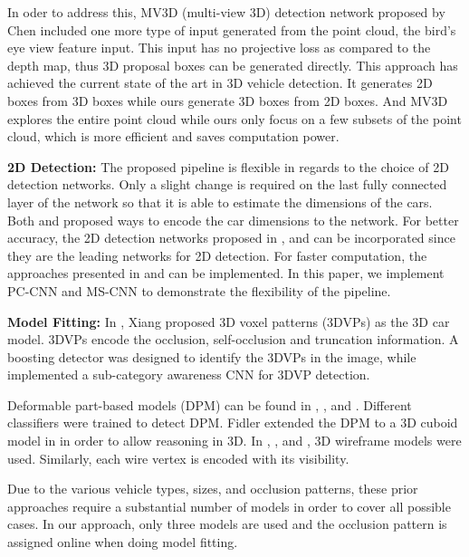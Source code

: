 \documentclass[letterpaper, 10 pt, conference]{ieeeconf}  \usepackage[
\begin{document}
In oder to address this, MV3D (multi-view 3D) detection network proposed by Chen  \cite{Chen2017CVPR} included one more type of input generated from the point cloud, the bird's eye view feature input. This input has no projective loss as compared to the depth map, thus 3D proposal boxes can be generated directly. This approach has achieved the current state of the art in 3D vehicle detection. It generates 2D boxes from 3D boxes while ours generate 3D boxes from 2D boxes. And MV3D explores the entire point cloud while ours only focus on a few subsets of the point cloud, which is more efficient and saves computation power.

\textbf{2D Detection:} The proposed pipeline is flexible in regards to the choice of 2D detection networks. Only a slight change is required on the last fully connected layer of the network so that it is able to estimate the dimensions of the cars. Both \cite{mousavian20163d} and \cite{deepmanta_cvpr17} proposed ways to encode the car dimensions to the network. For better accuracy, the 2D detection networks proposed in \cite{Ren17CVPR}, \cite{deepmanta_cvpr17} and \cite{yang2016exploit} can be incorporated since they are the leading networks for 2D detection. For faster computation, the approaches presented in \cite{redmon2017yolo9000} and \cite{liu2016ssd} can be implemented. In this paper, we implement PC-CNN \cite{du2017iros} and MS-CNN \cite{cai2016unified} to demonstrate the flexibility of the pipeline.

\textbf{Model Fitting:} In \cite{xiang2015data}, Xiang  proposed 3D voxel patterns (3DVPs) as the 3D car model. 3DVPs encode the occlusion, self-occlusion and truncation information. A boosting detector was designed to identify the 3DVPs in the image, while \cite{xiang2017subcategory} implemented a sub-category awareness CNN for 3DVP detection. 

Deformable part-based models (DPM) can be found in \cite{pepik2012teaching}, \cite{forsyth2014object}, \cite{yebes2014supervised} and \cite{pepik2015multi}. Different classifiers were trained to detect DPM. Fidler  extended the DPM to a 3D cuboid model in \cite{fidler20123d} in order to allow reasoning in 3D. In \cite{zeeshan2013explicit}, \cite{zia2013detailed}, \cite{zeeshan2014cars} and \cite{deepmanta_cvpr17}, 3D wireframe models were used. Similarly, each wire vertex is encoded with its visibility.  

Due to the various vehicle types, sizes, and occlusion patterns, these prior approaches require a substantial number of models in order to cover all possible cases. In our approach, only three models are used and the occlusion pattern is assigned online when doing model fitting.
\end{document}
